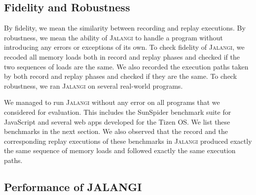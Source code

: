 \documentclass{sig-alternate}
\def\jalangi{\textsc{Jalangi}}
\begin{document}
\subsection{Fidelity and Robustness}
\label{sec:fidelity-robustness}

By fidelity, we mean the similarity between recording and replay
executions.  By robustness, we mean the ability of \jalangi{} to
handle a program without introducing any errors or exceptions of its
own.  To check fidelity of \jalangi{}, we recoded all memory loads
both in record and replay phases and checked if the two sequences of
loads are the same.  We also recorded the execution paths taken by
both record and replay phases and checked if they are the same.  To
check robustness, we ran \jalangi{} on several real-world programs.

We managed to run \jalangi{} without any error on all programs that we
considered for evaluation.  This includes the SunSpider benchmark
suite for JavaScript and several web apps developed for the Tizen OS.
We list these benchmarks in the next section.  We also observed that
the record and the corresponding replay executions of these benchmarks
in \jalangi{} produced exactly the same sequence of memory loads and
followed exactly the same execution paths.

\subsection{Performance of  JALANGI}
\label{sec:performance-jalangi}
\end{document}
